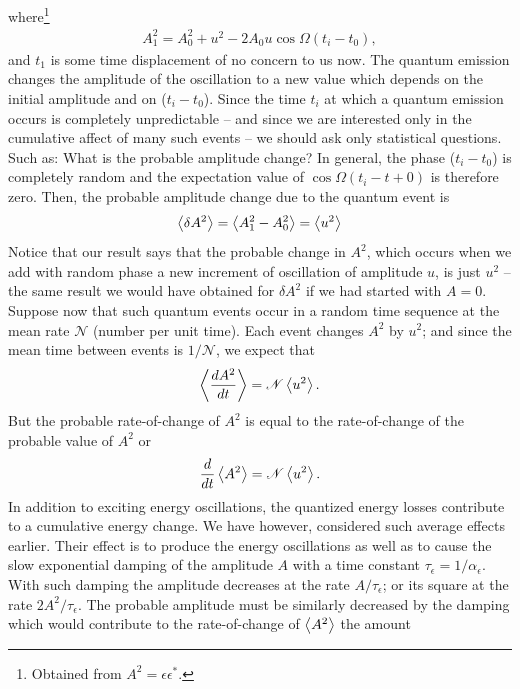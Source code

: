 where\footnote{Obtained from $A^2 = \epsilon \epsilon^*$.}
\begin{align}
	A_1^2 = A_0^2 + u^2 - 2 A_0 u \cos \Omega (t_i - t_0),
\end{align}
and $t_1$ is some time displacement of no concern to us now. The quantum emission changes the amplitude of the oscillation to a new value which depends on the initial amplitude and on ($t_i - t_0$). Since the time $t_i$ at which a quantum emission occurs is completely unpredictable -- and since we are interested only in the cumulative affect of many such events -- we should ask only statistical questions. Such as: What is the probable amplitude change? In general, the phase ($t_i - t_0$) is completely random and the expectation value of $\cos\Omega(t_i - t+0)$ is therefore zero. Then, the probable amplitude change due to the quantum event is
\begin{align}\label{eq:5.25}
	\left< \delta A^2 \right> = \left< A_1^2 - A_0^2 \right> = \left< u^2 \right>
\end{align}
Notice that our result says that the probable change in $A^2$, which occurs when we add with random phase a new increment of oscillation of amplitude $u$, is just $u^2$ -- the same result we would have obtained for $\delta A^2$ if we had started with $A = 0$.\\
Suppose now that such quantum events occur in a random time sequence at the mean rate $\mathscr{N}$ (number per unit time). Each event changes $A^2$ by $u^2$; and since the mean time between events is $1/\mathscr{N}$, we expect that
\begin{align}\label{eq:5.26}
	\left< \dfrac{dA^2}{dt} \right> = \mathscr{N} \left< u^2 \right>.
\end{align}
But the probable rate-of-change of $A^2$ is equal to the rate-of-change of the probable value of $A^2$ or
\begin{align} \label{eq:5.27}
	\dfrac{d}{dt}\left< A^2 \right> = \mathscr{N} \left< u^2 \right>.
\end{align}
In addition to exciting energy oscillations, the quantized energy losses contribute to a cumulative energy change. We have however, considered such average effects earlier. Their effect is to produce the energy oscillations as well as to cause the slow exponential damping of the amplitude $A$ with a time constant $\tau_\epsilon= 1/\alpha_\epsilon$. With such damping the amplitude decreases at the rate $A/\tau_\epsilon$; or its square at the rate $2A^2/\tau_\epsilon$. The probable amplitude must be similarly decreased by the damping which would contribute to the rate-of-change of $\left< A^2 \right>$ the amount
